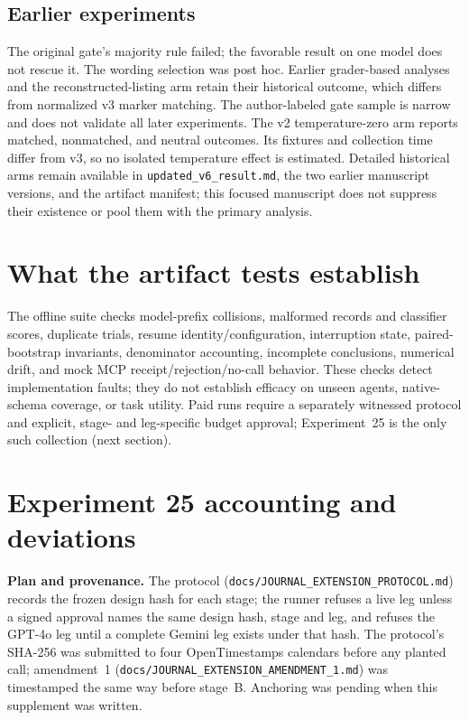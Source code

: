 \documentclass[11pt]{article}
\begin{document}
\subsection*{Earlier experiments}
The original gate's majority rule failed; the favorable result on one model
does not rescue it. The wording selection was post hoc. Earlier grader-based
analyses and the reconstructed-listing arm retain their historical outcome,
which differs from normalized v3 marker matching. The author-labeled gate
sample is narrow and does not validate all later experiments.
The v2 temperature-zero arm reports \JournalTzeroDiagonal{} matched,
\JournalTzeroOff{} nonmatched, and \JournalTzeroNeutral{} neutral outcomes.
Its fixtures and collection time differ from v3, so no isolated temperature
effect is estimated. Detailed historical arms remain available in
\texttt{updated\_v6\_result.md}, the two earlier manuscript versions, and the
artifact manifest; this focused manuscript does not suppress their existence
or pool them with the primary analysis.

\section{What the artifact tests establish}
The offline suite checks model-prefix collisions, malformed records and
classifier scores, duplicate trials, resume identity/configuration, interruption
state, paired-bootstrap invariants, denominator accounting, incomplete
conclusions, numerical drift, and mock MCP receipt/rejection/no-call behavior.
These checks detect implementation faults; they do not establish efficacy on
unseen agents, native-schema coverage, or task utility. Paid runs require a
separately witnessed protocol and explicit, stage- and leg-specific budget
approval; Experiment~25 is the only such collection (next section).

\section{Experiment 25 accounting and deviations}
\textbf{Plan and provenance.} The protocol
(\texttt{docs/JOURNAL\_EXTENSION\_PROTOCOL.md}) records the frozen design hash
for each stage; the runner refuses a live leg unless a signed approval names the
same design hash, stage and leg, and refuses the GPT-4o leg until a complete
Gemini leg exists under that hash. The protocol's SHA-256 was submitted to four
OpenTimestamps calendars before any planted call; amendment~1
(\texttt{docs/JOURNAL\_EXTENSION\_AMENDMENT\_1.md}) was timestamped the same way
before stage~B. Anchoring was pending when this supplement was written.
\end{document}
